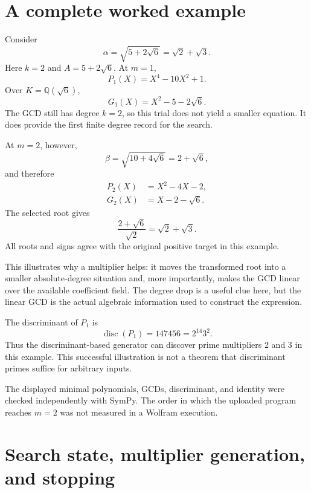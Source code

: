 \documentclass[11pt,letterpaper]{article}
\newcommand{\Q}{\mathbb{Q}}
\DeclareMathOperator{\disc}{disc}
\theoremstyle{definition}
\begin{document}
\section{A complete worked example}
\label{sec:worked}
Consider
\begin{equation}
 \alpha=\sqrt{5+2\sqrt6}=\sqrt2+\sqrt3.
\end{equation}
Here $k=2$ and $A=5+2\sqrt6$. At $m=1$,
\begin{equation}
 P_1(X)=X^4-10X^2+1.
\end{equation}
Over $K=\Q(\sqrt6)$,
\begin{equation}
 G_1(X)=X^2-5-2\sqrt6.
\end{equation}
The GCD still has degree $k=2$, so this trial does not yield a smaller equation.
It does provide the first finite degree record for the search.

At $m=2$, however,
\begin{equation}
 \beta=\sqrt{10+4\sqrt6}=2+\sqrt6,
\end{equation}
and therefore
\begin{align}
 P_2(X)&=X^2-4X-2,\\
 G_2(X)&=X-2-\sqrt6.
\end{align}
The selected root gives
\begin{equation}
 \frac{2+\sqrt6}{\sqrt2}=\sqrt2+\sqrt3.
\end{equation}
All roots and signs agree with the original positive target in this example.

This illustrates why a multiplier helps: it moves the transformed root into a
smaller absolute-degree situation and, more importantly, makes the GCD linear over
the available coefficient field. The degree drop is a useful clue here, but the
linear GCD is the actual algebraic information used to construct the expression.

The discriminant of $P_1$ is
\begin{equation}
 \disc(P_1)=147456=2^{14}3^2.
\end{equation}
Thus the discriminant-based generator can discover prime multipliers 2 and 3 in
this example. This successful illustration is not a theorem that discriminant
primes suffice for arbitrary inputs.

The displayed minimal polynomials, GCDs, discriminant, and identity were checked
independently with SymPy. The order in which the uploaded program reaches $m=2$
was not measured in a Wolfram execution.

\section{Search state, multiplier generation, and stopping}
\label{sec:search}
\end{document}
